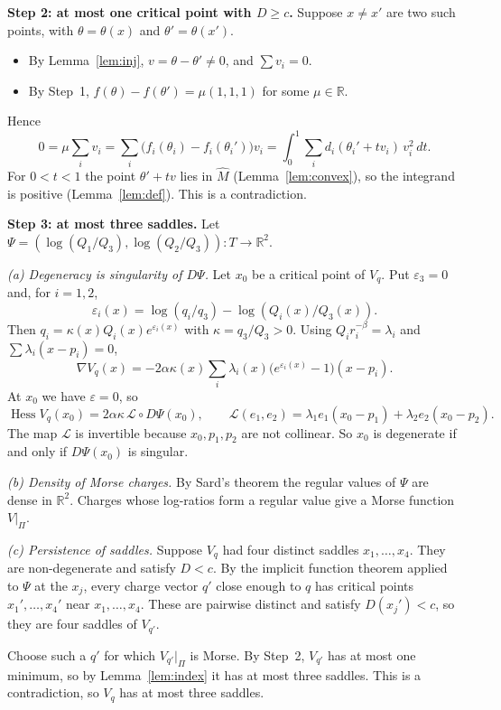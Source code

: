 \documentclass[11pt]{amsart}
\theoremstyle{remark}
\newcommand{\R}{\mathbb{R}}
\newcommand{\eps}{\varepsilon}
\DeclareMathOperator{\Hess}{Hess}
\begin{document}
\medskip\noindent\textbf{Step 2: at most one critical point with $D\ge c$.} Suppose $x\ne x'$ are two such points, with
$\theta=\theta(x)$ and $\theta'=\theta(x')$.
\begin{itemize}
\item By Lemma~\ref{lem:inj}, $v=\theta-\theta'\ne0$, and $\sum v_i=0$.
\item By Step~1, $f(\theta)-f(\theta')=\mu(1,1,1)$ for some $\mu\in\R$.
\end{itemize}
Hence
\[
  0=\mu\sum_iv_i=\sum_i\bigl(f_i(\theta_i)-f_i(\theta_i')\bigr)v_i=\int_0^1\sum_id_i(\theta_i'+tv_i)\,v_i^2\,dt .
\]
For $0<t<1$ the point $\theta'+tv$ lies in $\widehat M$ (Lemma~\ref{lem:convex}), so the integrand is positive
(Lemma~\ref{lem:def}). This is a contradiction.

\medskip\noindent\textbf{Step 3: at most three saddles.}
Let $\Psi=(\log(Q_1/Q_3),\log(Q_2/Q_3))\colon T\to\R^2$.

\emph{(a) Degeneracy is singularity of $D\Psi$.} Let $x_0$ be a critical point of $V_q$. Put $\eps_3=0$ and, for
$i=1,2$,
\[
  \eps_i(x)=\log(q_i/q_3)-\log(Q_i(x)/Q_3(x)) .
\]
Then $q_i=\kappa(x)Q_i(x)e^{\eps_i(x)}$ with $\kappa=q_3/Q_3>0$. Using $Q_ir_i^{-\beta}=\lambda_i$ and
$\sum\lambda_i(x-p_i)=0$,
\[
  \nabla V_q(x)=-2\alpha\kappa(x)\sum_i\lambda_i(x)\bigl(e^{\eps_i(x)}-1\bigr)(x-p_i).
\]
At $x_0$ we have $\eps=0$, so
\[
  \Hess V_q(x_0)=2\alpha\kappa\,\mathcal L\circ D\Psi(x_0),\qquad
  \mathcal L(e_1,e_2)=\lambda_1e_1(x_0-p_1)+\lambda_2e_2(x_0-p_2).
\]
The map $\mathcal L$ is invertible because $x_0,p_1,p_2$ are not collinear. So $x_0$ is degenerate if and only if
$D\Psi(x_0)$ is singular.

\emph{(b) Density of Morse charges.} By Sard's theorem the regular values of $\Psi$ are dense in $\R^2$. Charges whose
log-ratios form a regular value give a Morse function $V|_\Pi$.

\emph{(c) Persistence of saddles.} Suppose $V_q$ had four distinct saddles $x_1,\dots,x_4$. They are non-degenerate and
satisfy $D<c$. By the implicit function theorem applied to $\Psi$ at the $x_j$, every charge vector $q'$ close enough
to $q$ has critical points $x_1',\dots,x_4'$ near $x_1,\dots,x_4$. These are pairwise distinct and satisfy $D(x_j')<c$,
so they are four saddles of $V_{q'}$.

Choose such a $q'$ for which $V_{q'}|_\Pi$ is Morse. By Step~2, $V_{q'}$ has at most one minimum, so by
Lemma~\ref{lem:index} it has at most three saddles. This is a contradiction, so $V_q$ has at most three saddles.
\end{document}
